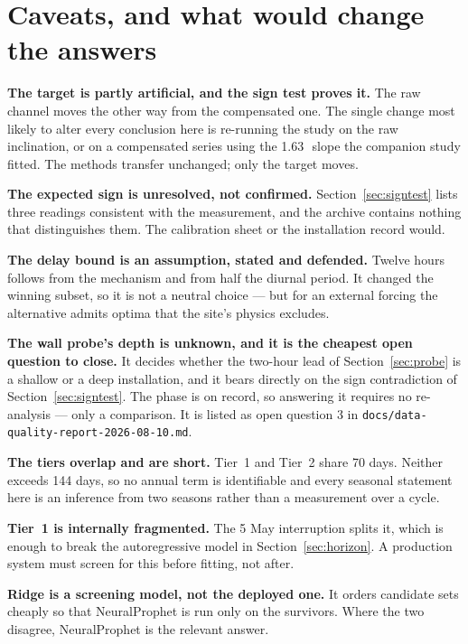 \documentclass[11pt,a4paper]{article}
\begin{document}
\section{Caveats, and what would change the answers}

\textbf{The target is partly artificial, and the sign test proves it.} The raw
channel moves the other way from the compensated one. The single change most
likely to alter every conclusion here is re-running the study on the raw
inclination, or on a compensated series using the 1.63\,\mdegC\ slope the
companion study fitted. The methods transfer unchanged; only the target moves.

\textbf{The expected sign is unresolved, not confirmed.} Section~\ref{sec:signtest}
lists three readings consistent with the measurement, and the archive contains
nothing that distinguishes them. The calibration sheet or the installation record
would.

\textbf{The delay bound is an assumption, stated and defended.} Twelve hours
follows from the mechanism and from half the diurnal period. It changed the
winning subset, so it is not a neutral choice --- but for an external forcing the
alternative admits optima that the site's physics excludes.

\textbf{The wall probe's depth is unknown, and it is the cheapest open question
to close.} It decides whether the two-hour lead of
Section~\ref{sec:probe} is a shallow or a deep installation, and it bears
directly on the sign contradiction of Section~\ref{sec:signtest}. The phase is on
record, so answering it requires no re-analysis --- only a comparison. It is
listed as open question 3 in \texttt{docs/data-quality-report-2026-08-10.md}.

\textbf{The tiers overlap and are short.} Tier~1 and Tier~2 share 70 days.
Neither exceeds 144 days, so no annual term is identifiable and every seasonal
statement here is an inference from two seasons rather than a measurement over a
cycle.

\textbf{Tier~1 is internally fragmented.} The 5 May interruption splits it, which
is enough to break the autoregressive model in Section~\ref{sec:horizon}. A
production system must screen for this before fitting, not after.

\textbf{Ridge is a screening model, not the deployed one.} It orders candidate
sets cheaply so that NeuralProphet is run only on the survivors. Where the two
disagree, NeuralProphet is the relevant answer.
\end{document}
